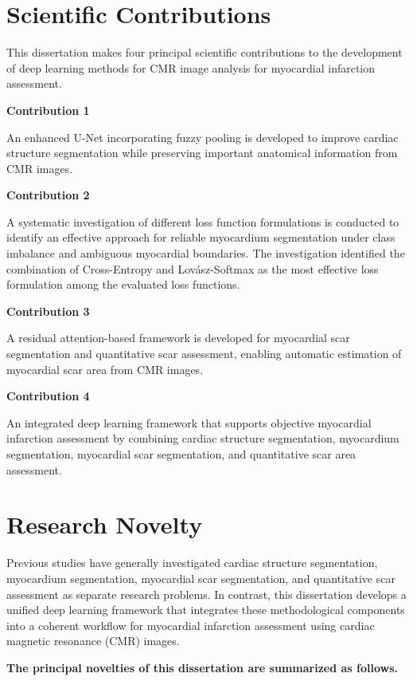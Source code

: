 \section{Scientific Contributions}
\label{sec:scientific-contributions}

This dissertation makes four principal scientific contributions to the
development of deep learning methods for CMR image analysis for
myocardial infarction assessment.

\textbf{Contribution 1}

An enhanced U-Net incorporating fuzzy pooling is developed to improve
cardiac structure segmentation while preserving important anatomical
information from CMR images.

\textbf{Contribution 2}

A systematic investigation of different loss function formulations is
conducted to identify an effective approach for reliable myocardium
segmentation under class imbalance and ambiguous myocardial boundaries.
The investigation identified the combination of Cross-Entropy and
Lovász-Softmax as the most effective loss formulation among the
evaluated loss functions.

\textbf{Contribution 3}

A residual attention-based framework is developed for myocardial scar
segmentation and quantitative scar assessment, enabling automatic
estimation of myocardial scar area from CMR images.

\textbf{Contribution 4}

An integrated deep learning framework that supports objective myocardial
infarction assessment by combining cardiac structure segmentation,
myocardium segmentation, myocardial scar segmentation, and quantitative
scar area assessment.

\section{Research Novelty}
\label{sec:research-novelty}

Previous studies have generally investigated cardiac structure
segmentation, myocardium segmentation, myocardial scar segmentation, and
quantitative scar assessment as separate research problems. In contrast,
this dissertation develops a unified deep learning framework that
integrates these methodological components into a coherent workflow for
myocardial infarction assessment using cardiac magnetic resonance (CMR)
images.

\textbf{The principal novelties of this dissertation are summarized as
	follows.}

